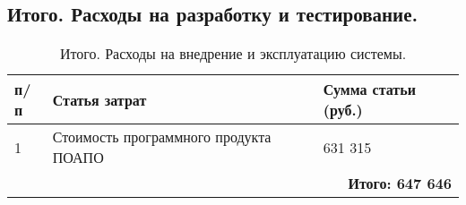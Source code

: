 \subsection{Итого. Расходы на разработку  и тестирование.}
\begin{table}[tb!h]
	\caption{Итого. Расходы на внедрение и эксплуатацию системы.}
    \centering
        \begin{tabular}{|l|l|l|}
        		\hline
        		\textnumero п/п & Статья затрат & Сумма статьи (руб.) \\
        		\hline
        		1 & Стоимость программного продукта ПОАПО & 631 315 \\
        		\hline
        		\multicolumn{3}{|r|}{\textbf{Итого: 647 646} }\\
        		\hline
        \end{tabular}   		
\end{table}